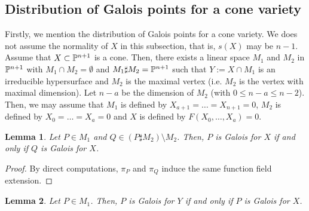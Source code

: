 \documentclass[10pt,oneside]{amsart}
\newtheorem{lemma}{Lemma}
\theoremstyle{definition}
\begin{document}
\subsection{Distribution of Galois points for a cone variety}
Firstly, we mention the distribution of Galois points for a cone variety. 
We does not assume the normality of $X$ in this subsection, that is, $s(X)$ may be $n-1$. 
Assume that $X \subset \Bbb P^{n+1}$ is a cone. 
Then, there exists a linear space $M_1$ and $M_2$ in $\Bbb P^{n+1}$ with $M_1 \cap M_2 = \emptyset$ and $M_1 \sharp M_2=\Bbb P^{n+1}$ such that $Y:=X \cap M_1$ is an irreducible hypersurface and $M_2$ is the maximal vertex (i.e. $M_2$ is the vertex with maximal dimension). 
Let $n-a$ be the dimension of $M_2$ (with $0 \le n-a \le n-2$). 
Then, we may assume that $M_1$ is defined by $X_{a+1}=\dots=X_{n+1}=0$, $M_2$ is defined by $X_0=\dots=X_{a}=0$ and $X$ is defined by $F(X_0, \ldots, X_{a})=0$. 

\begin{lemma} \label{Cone1}
Let $P \in M_1$ and $Q \in (P \sharp M_2) \setminus M_2$. 
Then, $P$ is Galois for $X$ if and only if $Q$ is Galois for $X$. 
\end{lemma}

\begin{proof}
By direct computations, $\pi_P$ and $\pi_Q$ induce the same function field extension. 
\end{proof}

\begin{lemma} \label{Cone2}
Let $P \in M_1$. 
Then, $P$ is Galois for $Y$ if and only if $P$ is Galois for $X$.  
\end{lemma}
\end{document}
